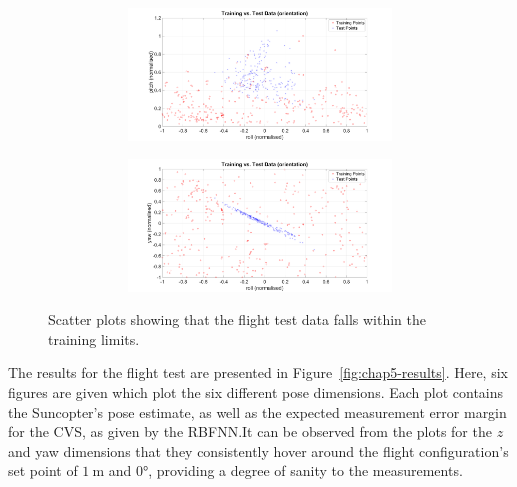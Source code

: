\begin{figure}
\begin{subfigure}{\textwidth}
\begin{subfigure}{0.48\textwidth}
      \includegraphics[clip, trim = 100 0 100 0, width=\textwidth]{figures/chapter5/tr_v_ts_rollpitch}
    \end{subfigure}
    \begin{subfigure}{0.48\textwidth}
      \includegraphics[clip, trim = 100 0 100 0, width=\textwidth]{figures/chapter5/tr_v_ts_rollyaw}
    \end{subfigure}
    \caption{}
  \end{subfigure}
  \caption[Scatter plots of flight data vs.\ training data. ]{Scatter plots showing that the flight test data falls within the training limits. }
\label{fig:chap5-ts-tr-scatter}
\end{figure}

The results for the flight test are presented in Figure~\ref{fig:chap5-results}. Here, six figures are given which plot the six different pose dimensions. Each plot contains the Suncopter's pose estimate, as well as the expected measurement error margin for the CVS, as given by the RBFNN.\@ It can be observed from the plots for the $z$ and yaw dimensions that they consistently hover around the flight configuration's set point of $\SI{1}{\m}$ and $\ang{0}$, providing a degree of sanity to the measurements. 
  
